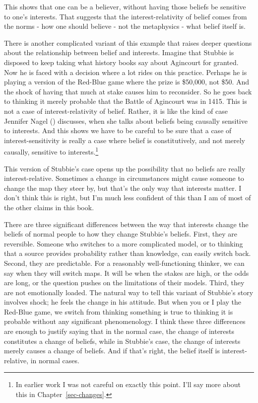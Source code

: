 \documentclass[
  10pt,
  letterpaper,
  twoside]{scrbook}
\begin{document}
This shows that one can be a believer, without having those beliefs be
sensitive to one's interests. That suggests that the interest-relativity
of belief comes from the norms - how one should believe - not the
metaphysics - what belief itself is.

There is another complicated variant of this example that raises deeper
questions about the relationship between belief and interests. Imagine
that Stubbie is disposed to keep taking what history books say about
Agincourt for granted. Now he is faced with a decision where a lot rides
on this practice. Perhaps he is playing a version of the Red-Blue game
where the prize is \$50,000, not \$50. And the shock of having that much
at stake causes him to reconsider. So he goes back to thinking it merely
probable that the Battle of Agincourt was in 1415. This is not a case of
interest-relativity of belief. Rather, it is like the kind of case
Jennifer Nagel () discusses, when she
talks about beliefs being causally sensitive to interests. And this
shows we have to be careful to be sure that a case of
interest-sensitivity is really a case where belief is constitutively,
and not merely causally, sensitive to interests.\footnote{In earlier
  work I was not careful on exactly this point. I'll say more about this
  in Chapter~\ref{sec-changes}.}

This version of Stubbie's case opens up the possibility that no beliefs
are really interest-relative. Sometimes a change in circumstances might
cause someone to change the map they steer by, but that's the only way
that interests matter. I don't think this is right, but I'm much less
confident of this than I am of most of the other claims in this book.

There are three significant differences between the way that interests
change the beliefs of normal people to how they change Stubbie's
beliefs. First, they are reversible. Someone who switches to a more
complicated model, or to thinking that a source provides probability
rather than knowledge, can easily switch back. Second, they are
predictable. For a reasonably well-functioning thinker, we can say when
they will switch maps. It will be when the stakes are high, or the odds
are long, or the question pushes on the limitations of their models.
Third, they are not emotionally loaded. The natural way to tell this
variant of Stubbie's story involves shock; he feels the change in his
attitude. But when you or I play the Red-Blue game, we switch from
thinking something is true to thinking it is probable without any
significant phenomenology. I think these three differences are enough to
justify saying that in the normal case, the change of interests
constitutes a change of beliefs, while in Stubbie's case, the change of
interests merely causes a change of beliefs. And if that's right, the
belief itself is interest-relative, in normal cases.
\end{document}
